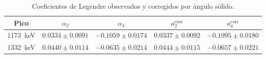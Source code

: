 \documentclass[11pt,a4paper]{article}
\begin{document}
\begin{table}[ht]
  \centering
  \caption{Coeficientes de Legendre observados y corregidos por \'angulo s\'olido.}
  \label{tab:coeficientes}
  \small
  \begin{tabular}{c|c|c|c|c}
    \hline
    Pico & $\alpha_2$ & $\alpha_4$ & $a_2^{\text{corr}}$ & $a_4^{\text{corr}}$ \\
    \hline
    1173~keV & $0.0334 \pm 0.0091$ & $-0.1059 \pm 0.0174$ &
              $0.0337 \pm 0.0092$ & $-0.1095 \pm 0.0180$ \\
    1332~keV & $0.0440 \pm 0.0114$ & $-0.0635 \pm 0.0214$ &
              $0.0444 \pm 0.0115$ & $-0.0657 \pm 0.0221$ \\
    \hline
  \end{tabular}
\end{table}
\end{document}
